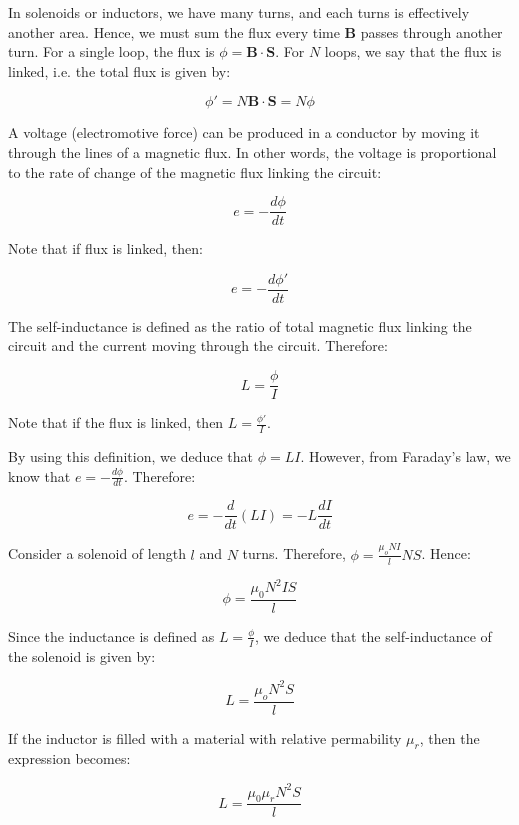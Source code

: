 \documentclass{article}
\begin{document}
\begin{proposition}
    In solenoids or inductors, we have many turns, and each turns is effectively another area. Hence, we must sum the flux every time $\mathbf{B}$ passes through another turn. For a single loop, the flux is $\phi = \mathbf{B} \cdot \mathbf{S}$. For $N$ loops, we say that the flux is linked, i.e. the total flux is given by:

    \[ \phi' = N\mathbf{B} \cdot \mathbf{S} = N\phi \]
\end{proposition}

\begin{theorem}
    A voltage (electromotive force) can be produced in a conductor by moving it through the lines of a magnetic flux. In other words, the voltage is proportional to the rate of change of the magnetic flux linking the circuit:

    \[ e = -\frac{d\phi}{dt} \]

    Note that if flux is linked, then:

    \[ e = -\frac{d\phi'}{dt} \]
\end{theorem}

\begin{definition}
    The self-inductance is defined as the ratio of total magnetic flux linking the circuit and the current moving through the circuit. Therefore:

    \[ L = \frac{\phi}{I} \]

    Note that if the flux is linked, then $L = \frac{\phi'}{I}$.
\end{definition}

By using this definition, we deduce that $\phi = LI$. However, from Faraday's law, we know that $e = -\frac{d\phi}{dt}$. Therefore:

\[ e = -\frac{d}{dt}(LI) = -L \frac{dI}{dt} \]

\begin{example}
    Consider a solenoid of length $l$ and $N$ turns. Therefore, $\phi = \frac{\mu_oNI}{l} NS$. Hence:

    \[ \phi = \frac{\mu_0N^2IS}{l} \]

    Since the inductance is defined as $L = \frac{\phi}{I}$, we deduce that the self-inductance of the solenoid is given by:

    \[ L = \frac{\mu_oN^2S}{l} \]

    If the inductor is filled with a material with relative permability $\mu_r$, then the expression becomes:

    \[ L = \frac{\mu_0\mu_rN^2S}{l} \]
\end{example}
\end{document}

